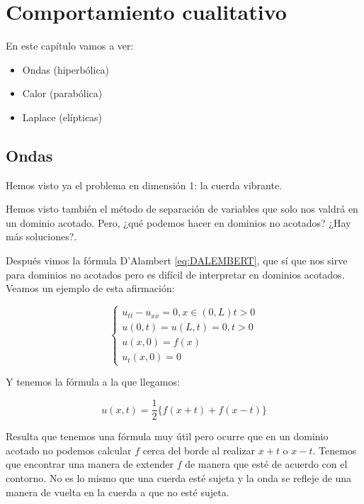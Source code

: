 \chapter{Comportamiento cualitativo}


En este capítulo vamos a ver:

\begin{itemize}

	\item Ondas (hiperbólica)
	\item Calor (parabólica)
	\item Laplace (elípticas)

\end{itemize}


\section{Ondas}

	Hemos visto ya el problema en dimensión 1: la cuerda vibrante.

	Hemos visto también el método de separación de variables que solo nos valdrá en un dominio acotado. Pero, ¿qué podemos hacer en dominios no acotados? ¿Hay más soluciones?.

	Después vimos la fórmula D'Alambert \eqref{eq:DALEMBERT}, que sí que nos sirve para dominios no acotados pero es difícil de interpretar en dominios acotados. Veamos un ejemplo de esta afirmación:

	\begin{example}

		\[\begin{cases}
			u_{tt} - u_{xx} = 0, x \in (0,L) t > 0 \\
			u(0,t) = u(L,t) = 0, t > 0\\
			u(x,0) = f(x) \\
			u_t(x,0) = 0
		\end{cases}\]

		Y tenemos la fórmula a la que llegamos:

		\[ u(x,t) = \frac{1}{2} \{f(x+t)+f(x-t)\}  \]

		Resulta que tenemos una fórmula muy útil pero ocurre que en un dominio acotado no podemos calcular $f$ cerca del borde al realizar $x+t$ o $x-t$. Tenemos que encontrar una manera de extender $f$ de manera que esté de acuerdo con el contorno. No es lo mismo que una cuerda esté sujeta y la onda se refleje de una manera de vuelta en la cuerda a que no esté sujeta.

		\begin{center}
		\end{center}

	\end{example}

